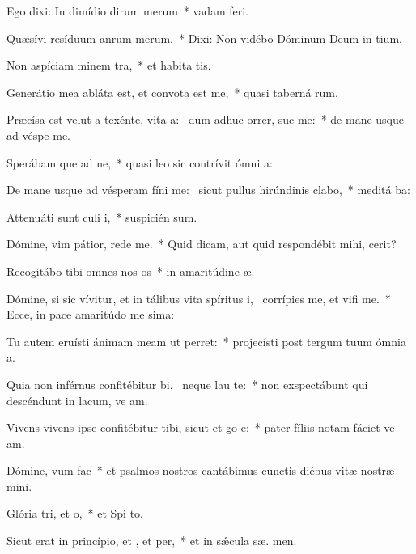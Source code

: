\item Ego dixi: In dimídio dirum merum~* vadam   feri.
\item Quæsívi resíduum anrum merum.~* Dixi: Non vidébo Dóminum Deum in  tium.
\item Non aspíciam minem tra,~* et habita tis.
\item Generátio mea abláta est, et convota est  me,~* quasi taberná rum.
\item Præcísa est velut a texénte, vita a:~\pscross{} dum adhuc orrer, suc me:~* de mane usque ad véspe  me.
\item Sperábam que ad ne,~* quasi leo sic contrívit ómni  a:
\item De mane usque ad vésperam fíni me:~\pscross{} sicut pullus hirúndinis  clabo,~* meditá  ba:
\item Attenuáti sunt culi i,~* suspicién  sum.
\item Dómine, vim pátior, rede  me.~* Quid dicam, aut quid respondébit mihi,   cerit?
\item Recogitábo tibi omnes nos os~* in amaritúdine  æ.
\item Dómine, si sic vívitur, et in tálibus vita spíritus i,~\pscross{} corrípies me, et vifi me.~* Ecce, in pace amaritúdo me sima:
\item Tu autem eruísti ánimam meam ut  perret:~* projecísti post tergum tuum ómnia  a.
\item Quia non inférnus confitébitur bi,~\pscross{} neque  lau te:~* non exspectábunt qui descéndunt in lacum, ve am.
\item Vivens vivens ipse confitébitur tibi, sicut et go e:~* pater fíliis notam fáciet ve am.
\item Dómine, vum  fac~* et psalmos nostros cantábimus cunctis diébus vitæ nostræ   mini.
\item Glória tri, et o,~* et Spi to.
\item Sicut erat in princípio, et , et per,~* et in sǽcula sæ. men.
